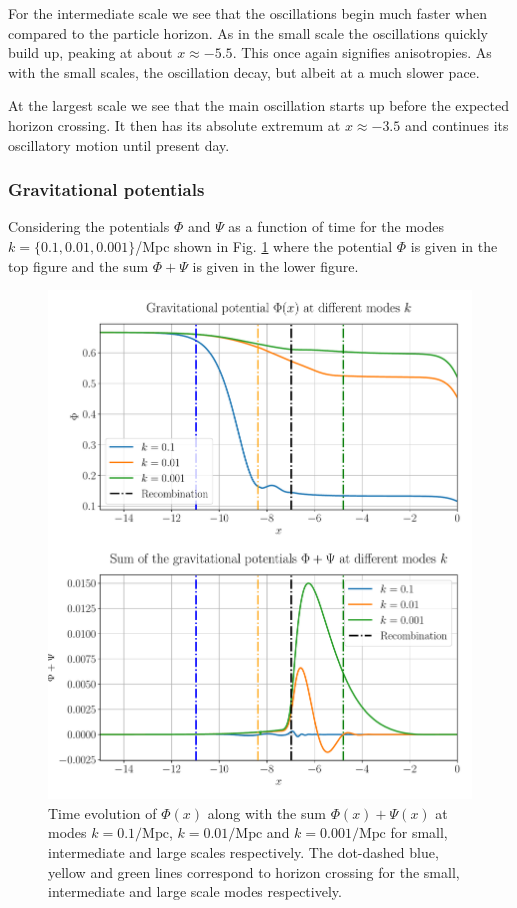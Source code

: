 \documentclass[%
reprint,
 amsmath,amssymb,
 aps,
]{revtex4-2}
\begin{document}
For the intermediate scale we see that the oscillations begin much faster when compared to the particle horizon. As in the small scale the oscillations quickly build up, peaking at about $x\approx-5.5$. This once again signifies anisotropies. As with the small scales, the oscillation decay, but albeit at a much slower pace.

At the largest scale we see that the main oscillation starts up before the expected horizon crossing. It then has its absolute extremum at $x\approx-3.5$ and continues its oscillatory motion until present day.


\subsubsection{Gravitational potentials}
Considering the potentials $\Phi$ and $\Psi$ as a function of time for the modes $k=\{0.1,0.01,0.001\}$/Mpc shown in Fig. \ref{fig:phi_psi} where the potential $\Phi$ is given in the top figure and the sum $\Phi+\Psi$ is given in the lower figure. 
\begin{figure}[ht!]
	\includegraphics[width = \linewidth]{Figures/Phi_Psi.pdf}
	\caption{Time evolution of $\Phi(x)$ along with the sum $\Phi(x)+\Psi(x)$ at modes $k=0.1/\text{Mpc}$, $k=0.01/\text{Mpc}$ and $k=0.001/\text{Mpc}$ for small, intermediate and large scales respectively. The dot-dashed blue, yellow and green lines correspond to horizon crossing for the small, intermediate and large scale modes respectively.}
	\label{fig:phi_psi}
\end{figure}
\end{document}
